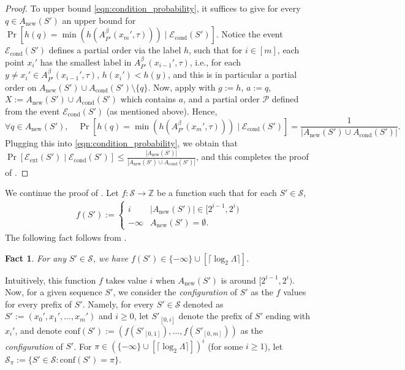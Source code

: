\documentclass[11pt,letterpaper]{article}
\theoremstyle{plain}
\newtheorem{fact}[theorem]{Fact}
\theoremstyle{definition}
\theoremstyle{remark}
\newcommand{\Econd}{\ensuremath{\mathcal{E}_{\mathrm{cond}}}\xspace}
\newcommand{\Eextend}{\ensuremath{\mathcal{E}_{\mathrm{ext}}}\xspace}
\newcommand{\Acond}{\ensuremath{A_{\mathrm{cond}}}\xspace}
\newcommand{\Anew}{\ensuremath{A_{\mathrm{new}}}\xspace}
\newcommand{\conf}{\ensuremath{\mathrm{conf}}\xspace}
\begin{document}
\begin{proof}
        To upper bound \eqref{eqn:condition_probability}, it suffices to give for every $q \in \Anew(S')$ an upper bound for $\Pr[h(q) = \min(h(A_{P'}^{\beta} (x_{m}', \tau)))\mid \Econd(S')]$. 
        Notice the event $\Econd(S')$ defines a partial order via the label $h$,
        such that for $i\in[m]$, each point $x_{i}'$ has the smallest label in $A_{P'}^{\beta}(x_{i-1}', \tau)$,
        i.e., for each $y\neq x_{i}'\in A_{P'}^{\beta}(x_{i-1}', \tau)$, $h(x_{i}')< h(y)$, and this is in particular a partial order on $\Anew(S')\cup \Acond(S') \setminus \{q\}$. 
        Now, apply  with $g:= h$, $a:= q$, $X:= \Anew(S')\cup \Acond(S')$ which contains $a$, and a partial order $\mathcal{P}$ defined from the event $\Econd(S')$ (as mentioned above). 
            Hence,  
        \begin{equation*}
            \forall q\in \Anew(S'), \quad \Pr[h(q) = \min(h(A_{P'}^{\beta}(x_{m}', \tau))) \mid \Econd(S')] = \frac{1}{|\Anew(S')\cup \Acond(S') |}.
        \end{equation*}
            Plugging this into \eqref{eqn:condition_probability}, we obtain that $\Pr[\Eextend(S')\mid \Econd(S')]\leq \frac{|\Anew(S')|}{|\Anew(S')\cup \Acond(S')|}$, 
            and this completes the proof of .  
        \end{proof}


        We continue the proof of .
Let $f: \mathcal{S}\to \mathbb{Z}$ be a function such that for each $S'\in \mathcal{S}$,  
        \begin{align*}
            f(S') := \begin{cases}
               i & |\Anew(S')| \in [2^{i-1}, 2^{i})  \\
               -\infty &  \Anew(S') = \emptyset.
            \end{cases}
        \end{align*}
        The following fact follows from .
        \begin{fact}
            For any $S' \in \mathcal{S}$, we have $f(S') \in \{-\infty\} \cup [\lceil \log_2 \Lambda \rceil] $.
        \end{fact}
Intuitively, this function $f$ takes value $i$ when $\Anew(S')$ is around $[2^{i-1}, 2^{i})$. 
Now, for a given sequence $S'$, we consider the \emph{configuration} of $S'$ as the $f$ values for every prefix of $S'$.
Namely, for every $S'\in\mathcal{S}$ denoted as $S':=(x_{0}', x_{1}', \ldots, x_{m}')$ and $i\geq 0$, let $S'_{[0, i]}$ denote the prefix of $S'$ ending with $x_{i}'$, 
        and denote $\conf(S'):= (f(S'_{[0,1]}), \ldots, f(S'_{[0, m]}))$ as the \emph{configuration} of $S'$.
        For $\pi\in (\{-\infty\} \cup [\lceil \log_2\Lambda \rceil])^{i}$ (for some $i\geq 1$), let $\mathcal{S}_{\pi} := \{S'\in \mathcal{S}: \conf(S') = \pi\}$. 
\end{document}
